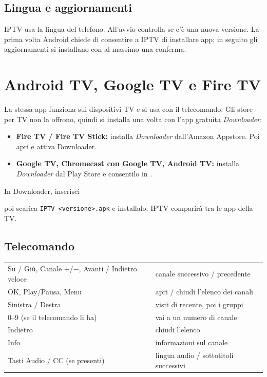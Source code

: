 \subsection{Lingua e aggiornamenti}
IPTV usa la lingua del telefono. All'avvio controlla se c'è una nuova
versione. La prima volta Android chiede di consentire a IPTV di installare
app; in seguito gli aggiornamenti si installano con al massimo una conferma.

\section{Android TV, Google TV e Fire TV}

La stessa app funziona sui dispositivi TV e si usa con il telecomando. Gli
store per TV non la offrono, quindi si installa una volta con l'app gratuita
\emph{Downloader}:

\begin{itemize}
  \item \textbf{Fire TV / Fire TV Stick:} installa \emph{Downloader}
        dall'Amazon Appstore. Poi apri  e attiva Downloader.
  \item \textbf{Google TV, Chromecast con Google TV, Android TV:} installa
        \emph{Downloader} dal Play Store e consentilo in
        .
\end{itemize}
In Downloader, inserisci
\begin{center}
  \download
\end{center}
poi scarica \texttt{IPTV-\textless versione\textgreater.apk} e installalo.
IPTV comparirà tra le app della TV.

\subsection{Telecomando}
\begin{xltabular}{\linewidth}{@{}KX@{}}
Su / Giù, Canale +/$-$, Avanti / Indietro veloce & canale successivo / precedente \\
OK, Play/Pausa, Menu & apri / chiudi l'elenco dei canali \\
Sinistra / Destra & visti di recente, poi i gruppi \\
0--9 (se il telecomando li ha) & vai a un numero di canale \\
Indietro & chiudi l'elenco \\
Info & informazioni sul canale \\
Tasti Audio / CC (se presenti) & lingua audio / sottotitoli successivi \\
\bottomrule
\end{xltabular}

